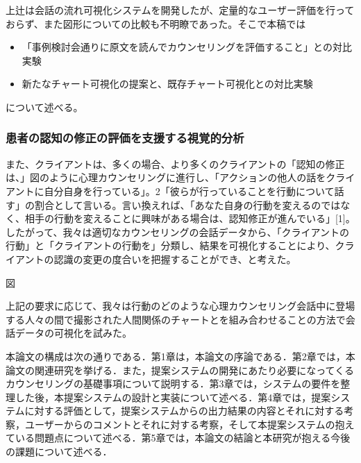 \documentclass[shuuron]{kuee}
\begin{document}
上辻は会話の流れ可視化システムを開発したが、定量的なユーザー評価を行っておらず、また図形についての比較も不明瞭であった。そこで本稿では
\begin{itemize}
\item 「事例検討会通りに原文を読んでカウンセリングを評価すること」との対比実験
\item 新たなチャート可視化の提案と、既存チャート可視化との対比実験
\end{itemize}
について述べる。

\subsubsection{患者の認知の修正の評価を支援する視覚的分析}

また、クライアントは、多くの場合、より多くのクライアントの「認知の修正は、」図のように心理カウンセリングに進行し、「アクションの他人の話をクライアントに自分自身を行っている」。2「彼らが行っていることを行動について話す」の割合として言いる。言い換えれば、「あなた自身の行動を変えるのではなく、相手の行動を変えることに興味がある場合は、認知修正が進んでいる」[1]。したがって、我々は適切なカウンセリングの会話データから、「クライアントの行動」と「クライアントの行動を」分類し、結果を可視化することにより、クライアントの認識の変更の度合いを把握することができ、と考えた。

図

上記の要求に応じて、我々は行動のどのような心理カウンセリング会話中に登場する人々の間で撮影された人間関係のチャートとを組み合わせることの方法で会話データの可視化を試みた。

本論文の構成は次の通りである．第1章は，本論文の序論である．第2章では，本論文の関連研究を挙げる．また，提案システムの開発にあたり必要になってくるカウンセリングの基礎事項について説明する．第3章では，システムの要件を整理した後，本提案システムの設計と実装について述べる．第4章では，提案システムに対する評価として，提案システムからの出力結果の内容とそれに対する考察，ユーザーからのコメントとそれに対する考察，そして本提案システムの抱えている問題点について述べる．第5章では，本論文の結論と本研究が抱える今後の課題について述べる．

%
\end{document}
